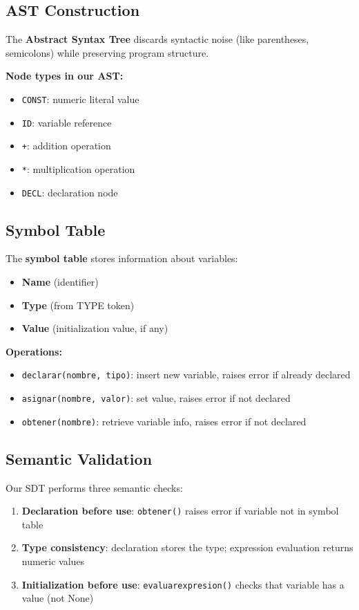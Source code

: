 \documentclass[letterpaper,12pt,oneside]{article}
\begin{document}
	\subsection{AST Construction}
	
	The \textbf{Abstract Syntax Tree} discards syntactic noise (like parentheses, semicolons) while preserving program structure.
	
	\textbf{Node types in our AST:}
	\begin{itemize}
		\item \texttt{CONST}: numeric literal value
		\item \texttt{ID}: variable reference
		\item \texttt{+}: addition operation
		\item \texttt{*}: multiplication operation
		\item \texttt{DECL}: declaration node
	\end{itemize}
	
	\subsection{Symbol Table}
	
	The \textbf{symbol table} stores information about variables:
	\begin{itemize}
		\item \textbf{Name} (identifier)
		\item \textbf{Type} (from TYPE token)
		\item \textbf{Value} (initialization value, if any)
	\end{itemize}
	
	\textbf{Operations:}
	\begin{itemize}
		\item \texttt{declarar(nombre, tipo)}: insert new variable, raises error if already declared
		\item \texttt{asignar(nombre, valor)}: set value, raises error if not declared
		\item \texttt{obtener(nombre)}: retrieve variable info, raises error if not declared
	\end{itemize}
	
	\subsection{Semantic Validation}
	
	Our SDT performs three semantic checks:
	
	\begin{enumerate}
		\item \textbf{Declaration before use}: \texttt{obtener()} raises error if variable not in symbol table
		\item \textbf{Type consistency}: declaration stores the type; expression evaluation returns numeric values
		\item \textbf{Initialization before use}: \texttt{evaluarexpresion()} checks that variable has a value (not None)
	\end{enumerate}
	
\end{document}
